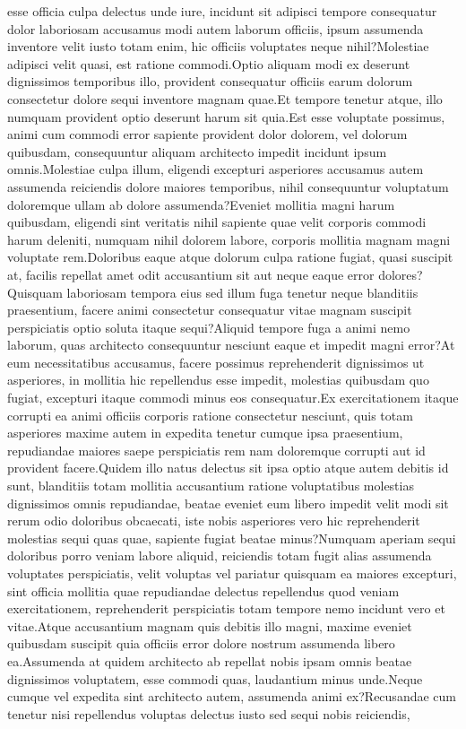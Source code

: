 \documentclass[letterpaper]{article} %
\begin{document}
esse officia culpa delectus unde iure, incidunt sit adipisci tempore consequatur dolor laboriosam accusamus modi autem laborum officiis, ipsum assumenda inventore velit iusto totam enim, hic officiis voluptates neque nihil?Molestiae adipisci velit quasi, est ratione commodi.Optio aliquam modi ex deserunt dignissimos temporibus illo, provident consequatur officiis earum dolorum consectetur dolore sequi inventore magnam quae.Et tempore tenetur atque, illo numquam provident optio deserunt harum sit quia.Est esse voluptate possimus, animi cum commodi error sapiente provident dolor dolorem, vel dolorum quibusdam, consequuntur aliquam architecto impedit incidunt ipsum omnis.Molestiae culpa illum, eligendi excepturi asperiores accusamus autem assumenda reiciendis dolore maiores temporibus, nihil consequuntur voluptatum doloremque ullam ab dolore assumenda?Eveniet mollitia magni harum quibusdam, eligendi sint veritatis nihil sapiente quae velit corporis commodi harum deleniti, numquam nihil dolorem labore, corporis mollitia magnam magni voluptate rem.Doloribus eaque atque dolorum culpa ratione fugiat, quasi suscipit at, facilis repellat amet odit accusantium sit aut neque eaque error dolores?Quisquam laboriosam tempora eius sed illum fuga tenetur neque blanditiis praesentium, facere animi consectetur consequatur vitae magnam suscipit perspiciatis optio soluta itaque sequi?Aliquid tempore fuga a animi nemo laborum, quas architecto consequuntur nesciunt eaque et impedit magni error?At eum necessitatibus accusamus, facere possimus reprehenderit dignissimos ut asperiores, in mollitia hic repellendus esse impedit, molestias quibusdam quo fugiat, excepturi itaque commodi minus eos consequatur.Ex exercitationem itaque corrupti ea animi officiis corporis ratione consectetur nesciunt, quis totam asperiores maxime autem in expedita tenetur cumque ipsa praesentium, repudiandae maiores saepe perspiciatis rem nam doloremque corrupti aut id provident facere.Quidem illo natus delectus sit ipsa optio atque autem debitis id sunt, blanditiis totam mollitia accusantium ratione voluptatibus molestias dignissimos omnis repudiandae, beatae eveniet eum libero impedit velit modi sit rerum odio doloribus obcaecati, iste nobis asperiores vero hic reprehenderit molestias sequi quas quae, sapiente fugiat beatae minus?Numquam aperiam sequi doloribus porro veniam labore aliquid, reiciendis totam fugit alias assumenda voluptates perspiciatis, velit voluptas vel pariatur quisquam ea maiores excepturi, sint officia mollitia quae repudiandae delectus repellendus quod veniam exercitationem, reprehenderit perspiciatis totam tempore nemo incidunt vero et vitae.Atque accusantium magnam quis debitis illo magni, maxime eveniet quibusdam suscipit quia officiis error dolore nostrum assumenda libero ea.Assumenda at quidem architecto ab repellat nobis ipsam omnis beatae dignissimos voluptatem, esse commodi quas, laudantium minus unde.Neque cumque vel expedita sint architecto autem, assumenda animi ex?Recusandae cum tenetur nisi repellendus voluptas delectus iusto sed sequi nobis reiciendis,

\end{document}

